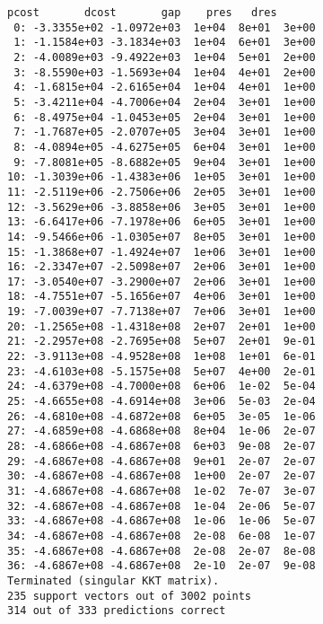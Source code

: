 \documentclass[11pt]{article}
\begin{document}
    \begin{Verbatim}[commandchars=\\\{\}]
     pcost       dcost       gap    pres   dres
 0: -3.3355e+02 -1.0972e+03  1e+04  8e+01  3e+00
 1: -1.1584e+03 -3.1834e+03  1e+04  6e+01  3e+00
 2: -4.0089e+03 -9.4922e+03  1e+04  5e+01  2e+00
 3: -8.5590e+03 -1.5693e+04  1e+04  4e+01  2e+00
 4: -1.6815e+04 -2.6165e+04  1e+04  4e+01  1e+00
 5: -3.4211e+04 -4.7006e+04  2e+04  3e+01  1e+00
 6: -8.4975e+04 -1.0453e+05  2e+04  3e+01  1e+00
 7: -1.7687e+05 -2.0707e+05  3e+04  3e+01  1e+00
 8: -4.0894e+05 -4.6275e+05  6e+04  3e+01  1e+00
 9: -7.8081e+05 -8.6882e+05  9e+04  3e+01  1e+00
10: -1.3039e+06 -1.4383e+06  1e+05  3e+01  1e+00
11: -2.5119e+06 -2.7506e+06  2e+05  3e+01  1e+00
12: -3.5629e+06 -3.8858e+06  3e+05  3e+01  1e+00
13: -6.6417e+06 -7.1978e+06  6e+05  3e+01  1e+00
14: -9.5466e+06 -1.0305e+07  8e+05  3e+01  1e+00
15: -1.3868e+07 -1.4924e+07  1e+06  3e+01  1e+00
16: -2.3347e+07 -2.5098e+07  2e+06  3e+01  1e+00
17: -3.0540e+07 -3.2900e+07  2e+06  3e+01  1e+00
18: -4.7551e+07 -5.1656e+07  4e+06  3e+01  1e+00
19: -7.0039e+07 -7.7138e+07  7e+06  3e+01  1e+00
20: -1.2565e+08 -1.4318e+08  2e+07  2e+01  1e+00
21: -2.2957e+08 -2.7695e+08  5e+07  2e+01  9e-01
22: -3.9113e+08 -4.9528e+08  1e+08  1e+01  6e-01
23: -4.6103e+08 -5.1575e+08  5e+07  4e+00  2e-01
24: -4.6379e+08 -4.7000e+08  6e+06  1e-02  5e-04
25: -4.6655e+08 -4.6914e+08  3e+06  5e-03  2e-04
26: -4.6810e+08 -4.6872e+08  6e+05  3e-05  1e-06
27: -4.6859e+08 -4.6868e+08  8e+04  1e-06  2e-07
28: -4.6866e+08 -4.6867e+08  6e+03  9e-08  2e-07
29: -4.6867e+08 -4.6867e+08  9e+01  2e-07  2e-07
30: -4.6867e+08 -4.6867e+08  1e+00  2e-07  2e-07
31: -4.6867e+08 -4.6867e+08  1e-02  7e-07  3e-07
32: -4.6867e+08 -4.6867e+08  1e-04  2e-06  5e-07
33: -4.6867e+08 -4.6867e+08  1e-06  1e-06  5e-07
34: -4.6867e+08 -4.6867e+08  2e-08  6e-08  1e-07
35: -4.6867e+08 -4.6867e+08  2e-08  2e-07  8e-08
36: -4.6867e+08 -4.6867e+08  2e-10  2e-07  9e-08
Terminated (singular KKT matrix).
235 support vectors out of 3002 points
314 out of 333 predictions correct

    \end{Verbatim}

    \begin{center}
    \end{center}
    { \hspace*{\fill} \\}
    
\end{document}
